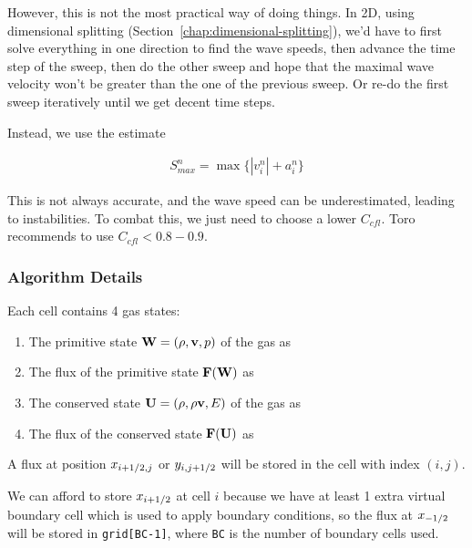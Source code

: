 However, this is not the most practical way of doing things.
In 2D, using dimensional splitting (Section~\ref{chap:dimensional-splitting}),
we'd have to first solve everything in one direction to find the wave speeds,
then advance the time step of the sweep, then do the other sweep and hope that
the maximal wave velocity won't be greater than the one of the previous sweep.
Or re-do the first sweep iteratively until we get decent time steps.

Instead, we use the estimate

\begin{align}
	S^n_{max} = \max\{ |v_i^n| + a_i^n \}
\end{align}

This is not always accurate, and the wave speed can be underestimated, leading
to instabilities. To combat this, we just need to choose a lower $C_{cfl}$.
Toro recommends to use $C_{cfl} < 0.8 - 0.9$.













\subsubsection{Algorithm Details}\label{chap:godunov-details}

Each cell contains 4 gas states:

\begin{enumerate}
\item The primitive state $\mathbf{W} = (\rho, \mathbf{v}, p)$ of the gas as 
\item The flux of the primitive state $\mathbf{F}(\mathbf{W})$ as 
\item The conserved state $\mathbf{U} = (\rho, \rho \mathbf{v}, E)$ of the gas as 
\item The flux of the conserved state $\mathbf{F}(\mathbf{U})$ as 
\end{enumerate}


A flux at position $x_{i+1/2, j}$ or $y_{i, j+1/2}$ will be stored in the
cell with index $(i, j)$.


We can afford to store $x_{i+1/2}$ at cell $i$ because we have at least 1
extra virtual boundary cell which is used to apply boundary conditions, so the
flux at $x_{-1/2}$ will be stored in \verb|grid[BC-1]|, where \texttt{BC} is
the number of boundary cells used.
 

